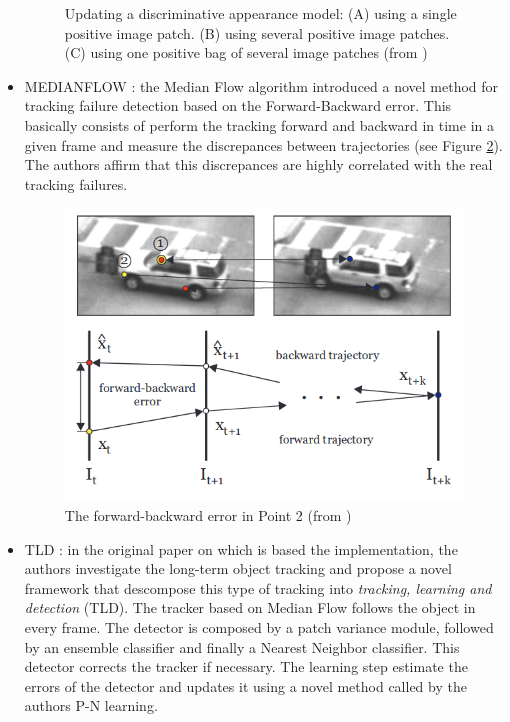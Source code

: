 \begin{itemize}
\begin{figure}[H]
\begin{center}
\caption{Updating a discriminative appearance model: (A) using a single positive image patch. (B) using several positive image patches. (C) using one positive bag of several image patches (from \cite{babenko2009visual})}
\label{fig:mil}
\end{center}
\end{figure}
\item MEDIANFLOW \cite{kalal2010forward}: the Median Flow algorithm introduced a novel method for tracking failure detection based on the Forward-Backward error. This  basically consists of perform the tracking forward and backward in time in a given frame and measure the discrepances between trajectories (see Figure \ref{fig:medianflow}). The authors affirm that this discrepances are highly correlated with the real tracking failures.
\begin{figure}[H]
\begin{center}
\includegraphics[scale=0.4]{figures/medianflow.png}
\caption{The forward-backward error in Point 2 (from \cite{kalal2010forward})}
\label{fig:medianflow}
\end{center}
\end{figure}    
\item TLD \cite{kalal2011tracking}: in the original paper on which is based the implementation, the authors investigate the long-term object tracking and propose a novel framework that descompose this type of tracking into \textit{tracking, learning and detection} (TLD). The tracker based on Median Flow follows the object in every frame. The detector is composed by a patch variance module, followed by an ensemble classifier and finally a Nearest Neighbor classifier. This detector corrects the tracker if necessary. The learning step estimate the errors of the detector and updates it using a novel method called by the authors P-N learning.

\end{itemize}
